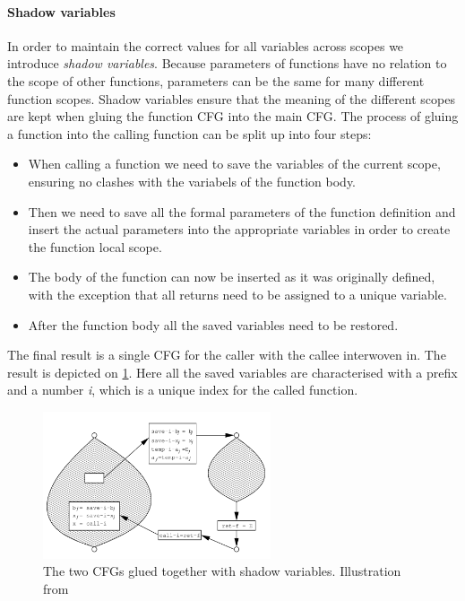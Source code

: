 \paragraph{Shadow variables}
In order to maintain the correct values for all variables across scopes we introduce \emph{shadow variables}.
Because parameters of functions have no relation to the scope of other functions, parameters can be the same for many different function scopes.
Shadow variables ensure that the meaning of the different scopes are kept when gluing the function CFG into the main CFG.
The process of gluing a function into the calling function can be split up into four steps:
\begin{itemize}
\item When calling a function we need to save the variables of the current scope, ensuring no clashes with the variabels of the function body.
\item Then we need to save all the formal parameters of the function definition and insert the actual parameters into the appropriate variables in order to create the function local scope.
\item The body of the function can now be inserted as it was originally defined, with the exception that all returns need to be assigned to a unique variable.
\item After the function body all the saved variables need to be restored.
\end{itemize}

The final result is a single CFG for the caller with the callee interwoven in.
The result is depicted on \cref{interprocedural_glue}.
Here all the saved variables are characterised with a prefix and a number \emph{i}, which is a unique index for the called function.


\begin{figure}[H]
  \center
  \includegraphics[width=0.6\textwidth]{figures/interprocedural_glue}
  \caption{The two CFGs glued together with shadow variables. Illustration from \citet[p.~38]{schwartzbach}}
  \label{interprocedural_glue}
\end{figure}


